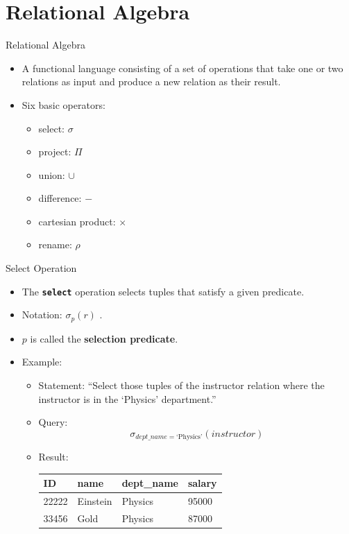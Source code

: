 \documentclass{beamer}
\begin{document}
\section{Relational Algebra}

\begin{frame}{Relational Algebra}
    \begin{itemize}
        \item A functional language consisting of a set of operations that take one or two relations as input and produce a new relation as their result.
        \item Six basic operators:
        \begin{itemize}
            \item select: $\sigma$
            \item project: $\Pi$
            \item union: $\cup$
            \item difference: $-$
            \item cartesian product: $\times$
            \item rename: $\rho$
        \end{itemize}
    \end{itemize}
\end{frame}

\begin{frame}{Select Operation}
    \begin{itemize}
        \item The \textbf{\texttt{select}} operation selects tuples that satisfy a given predicate.
        \item Notation: { \LARGE $\sigma_p (r)$ }.
        \item $p$ is called the \textbf{selection predicate}.
        \item Example: 
        \begin{itemize}
            \item Statement: ``Select those tuples of the instructor relation where the instructor is in the `Physics' department.''
            \item Query: 
                {\large
                $$
                    \sigma_{dept\_name = \text{`Physics'}} (instructor)
                $$}
            \item Result:\\
                \vspace{2mm}
                \centering
                \begin{tabular}{| l | l | l | l |}
                \hline
                 ID & name & dept\_name & salary \\
                 \hline
                 22222 & Einstein & Physics & 95000 \\
                 \hline
                 33456 & Gold & Physics & 87000 \\
                 \hline
                \end{tabular}
        \end{itemize}
    \end{itemize}
\end{frame}
\end{document}
